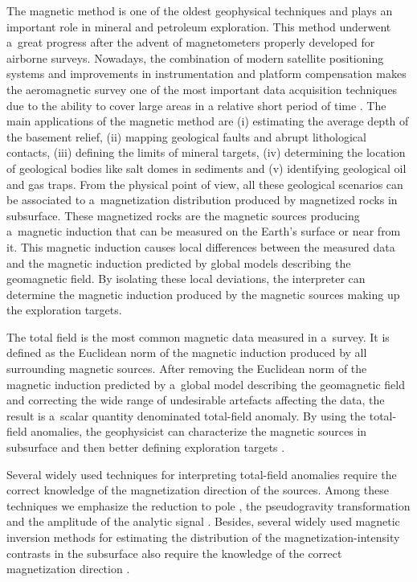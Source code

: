 \documentclass[journal abbreviation, npg]{copernicus}
\begin{document}
\introduction The magnetic method is one of the oldest geophysical techniques
and plays an important role in mineral and petroleum exploration. This method
underwent a~great progress after the advent of magnetometers properly
developed for airborne surveys. Nowadays, the combination of modern satellite
positioning systems and improvements in instrumentation and platform
compensation makes the aeromagnetic survey one of the most important 
data acquisition techniques due to the ability to cover large areas in a 
relative short period of time \citep{blakely1996,nabighian-etal2005}. 
The main applications
of the magnetic method are (i) estimating the average depth of the basement
relief, (ii) mapping geological faults and abrupt lithological contacts,
(iii) defining the limits of mineral targets, (iv) determining the location
of geological bodies like salt domes in sediments and (v) identifying
geological oil and gas traps. From the physical point of view, all these
geological scenarios can be associated to a~magnetization distribution
produced by magnetized rocks in subsurface. These magnetized rocks are the
magnetic sources producing a~magnetic induction that can be measured on the
Earth's surface or near from it. This magnetic induction causes local
differences between the measured data and the magnetic induction predicted by
global models describing the geomagnetic field. By isolating these local
deviations, the interpreter can determine the magnetic induction produced by
the magnetic sources making up the exploration targets.

The total field is the most common magnetic data measured in a~survey. It is
defined as the Euclidean norm of the magnetic induction produced by all
surrounding magnetic sources. After removing the Euclidean norm of the
magnetic induction predicted by a~global model describing the geomagnetic
field and correcting the wide range of undesirable artefacts affecting the
data, the result is a~scalar quantity denominated total-field anomaly. By 
using the total-field
anomalies, the geophysicist can characterize the magnetic sources in
subsurface and then better defining exploration targets
\citep{telford-etal1990,blakely1996}.

Several widely used techniques for interpreting total-field 
anomalies require the correct knowledge of the magnetization 
direction of the sources. Among these techniques we emphasize 
the reduction to pole \citep{baranov1957,baranov-naudy1964,silva1986}, 
the pseudogravity transformation \citep{baranov1957} and the amplitude 
of the analytic signal \citep{nabighian1972,nabighian1974, 
nabighian1984,li2006}. Besides, several widely used magnetic inversion 
methods for estimating the distribution of the magnetization-intensity 
contrasts in the subsurface also require the knowledge of the correct 
magnetization direction \citep{li-oldenburg1996, pilkington1997,
portniaguine-zhdanov1999, portniaguine-zhdanov2002, barbosa-silva2006}.
\end{document}
